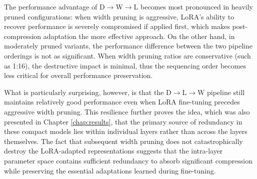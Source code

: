The performance advantage of D$\rightarrow$W$\rightarrow$L becomes most pronounced in heavily pruned configurations: when width pruning is aggressive, LoRA's ability to recover performance is severely compromised if applied first, which makes post-compression adaptation the more effective approach. On the other hand, in moderately pruned variants, the performance difference between the two pipeline orderings is not as significant. When width pruning ratios are conservative (such as 1:16), the destructive impact is minimal, thus the sequencing order becomes less critical for overall performance preservation.

What is particularly surprising, however, is that the D$\rightarrow$L$\rightarrow$W pipeline still maintains relatively good performance even when LoRA fine-tuning precedes aggressive width pruning. This resilience further proves the idea, which was also presented in Chapter \ref{chap:results}, that the primary source of redundancy in these compact models lies within individual layers rather than across the layers themselves. The fact that subsequent width pruning does not catastrophically destroy the LoRA-adapted representations suggests that the intra-layer parameter space contains sufficient redundancy to absorb significant compression while preserving the essential adaptations learned during fine-tuning.

